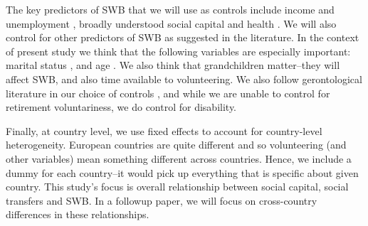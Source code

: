 \documentclass[10pt, letterpaper]{article}
\begin{document}
\begin{spacing}{1.4}


The key predictors of SWB that we will use as controls include income and
unemployment \citep[][]{ditella01moa,ditella01mob,ditella06m}, broadly
understood social
capital and health \citep{blanchflower11,dolan08al,bonsang12}. %
We will also control for other predictors of SWB as suggested in the 
literature. In the context of present study we think that the following
variables are especially important: marital status
\citep[e.g.,][]{myers00,diener04s}, and age \citep{ferring10}. We also think
that grandchildren matter--they will affect SWB, and also time available to volunteering.
%
We also follow gerontological literature in our choice of controls
\citep[e.g.,][]{meier2008volunteering,bonsang12,bender12,ferring10}, and while
we are unable to control for retirement voluntariness, we do control for
disability.

Finally, at country level, we use fixed effects to account for country-level
heterogeneity.
European countries are quite different and so volunteering (and other variables) mean something
different across countries.  Hence, we include a dummy for each country--it would pick up
everything that is specific about given country. This study's focus is overall
relationship between social capital, social transfers and SWB. In a followup
paper, we will focus on cross-country differences in these relationships. 



\end{spacing}
\end{document}
